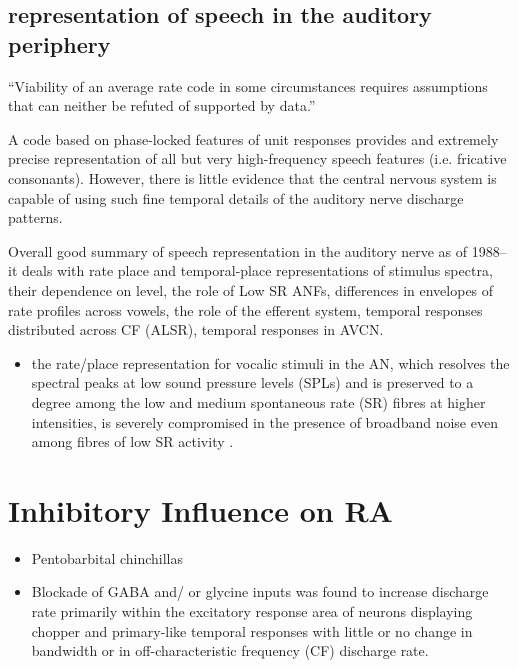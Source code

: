 \documentclass[10pt,a4paper]{article}
\begin{document}
\subsection{\citep{SachsWinslowEtAl:1988} representation of speech in the auditory periphery}

{\textquotedblleft}Viability of an average rate code in some circumstances
requires assumptions that can neither be refuted of supported by
data.{\textquotedblright}

A code based on phase-locked features of unit responses provides and extremely
precise representation of all but very high-frequency speech features
(i.e. fricative consonants).  However, there is little evidence that the central
nervous system is capable of using such fine temporal details of the auditory
nerve discharge patterns.

Overall good summary of speech representation in the auditory nerve as of 1988--
it deals with rate place and temporal-place representations of stimulus spectra,
their dependence on level, the role of Low SR ANFs, differences in envelopes of
rate profiles across vowels, the role of the efferent system, temporal responses
distributed across CF (ALSR), temporal responses in AVCN.

\citep{Geisler:1988}

\citep{RhodeGreenberg:1994a}


\begin{itemize}
\item the rate/place representation for vocalic stimuli in the AN, which
  resolves the spectral peaks at low sound pressure levels (SPLs) and is
  preserved to a degree among the low and medium spontaneous rate (SR) fibres at
  higher intensities, is severely compromised in the presence of broadband noise
  \citep{GeislerGamble:1989,SachsVoigtEtAl:1983} even among fibres of low SR
  activity \citep{SachsVoigtEtAl:1983,SilkesGeisler:1991}.
\end{itemize}

\section{Inhibitory Influence on RA}
\citep{CasparyBackoffEtAl:1994}


\begin{itemize}
\item Pentobarbital chinchillas
\item Blockade of GABA and/ or glycine inputs was found to increase discharge
  rate primarily within the excitatory response area of neurons displaying
  chopper and primary-like temporal responses with little or no change in
  bandwidth or in off-characteristic frequency (CF) discharge rate.
\end{itemize}
\end{document}
